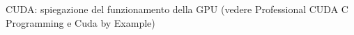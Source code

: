 CUDA: spiegazione del funzionamento della GPU (vedere Professional CUDA C Programming e Cuda by Example)